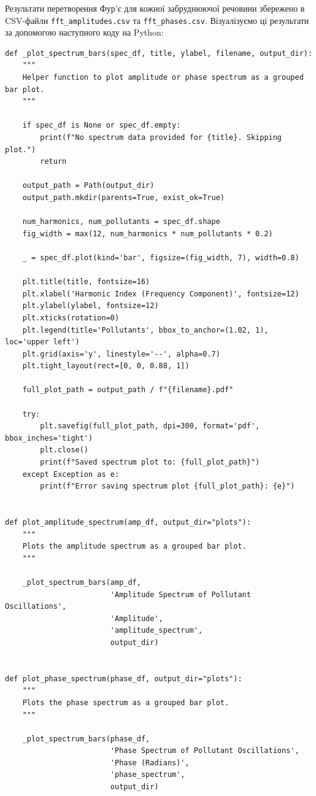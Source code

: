 \documentclass{exam_template}
\begin{document}
Результати перетворення Фур'є для кожної забруднюючої речовини 
збережено в CSV-файли \texttt{fft\_amplitudes.csv} та
\texttt{fft\_phases.csv}. Візуалізуємо ці результати 
за допомогою наступного коду на Python:
\begin{verbatim}
def _plot_spectrum_bars(spec_df, title, ylabel, filename, output_dir):
    """
    Helper function to plot amplitude or phase spectrum as a grouped bar plot.
    """
    
    if spec_df is None or spec_df.empty:
        print(f"No spectrum data provided for {title}. Skipping plot.")
        return

    output_path = Path(output_dir)
    output_path.mkdir(parents=True, exist_ok=True)

    num_harmonics, num_pollutants = spec_df.shape
    fig_width = max(12, num_harmonics * num_pollutants * 0.2)

    _ = spec_df.plot(kind='bar', figsize=(fig_width, 7), width=0.8)

    plt.title(title, fontsize=16)
    plt.xlabel('Harmonic Index (Frequency Component)', fontsize=12)
    plt.ylabel(ylabel, fontsize=12)
    plt.xticks(rotation=0)
    plt.legend(title='Pollutants', bbox_to_anchor=(1.02, 1), loc='upper left')
    plt.grid(axis='y', linestyle='--', alpha=0.7)
    plt.tight_layout(rect=[0, 0, 0.88, 1])

    full_plot_path = output_path / f"{filename}.pdf"

    try:
        plt.savefig(full_plot_path, dpi=300, format='pdf', bbox_inches='tight')
        plt.close()
        print(f"Saved spectrum plot to: {full_plot_path}")
    except Exception as e:
        print(f"Error saving spectrum plot {full_plot_path}: {e}")


def plot_amplitude_spectrum(amp_df, output_dir="plots"):
    """
    Plots the amplitude spectrum as a grouped bar plot.
    """
    
    _plot_spectrum_bars(amp_df,
                        'Amplitude Spectrum of Pollutant Oscillations',
                        'Amplitude',
                        'amplitude_spectrum',
                        output_dir)


def plot_phase_spectrum(phase_df, output_dir="plots"):
    """
    Plots the phase spectrum as a grouped bar plot.
    """
    
    _plot_spectrum_bars(phase_df,
                        'Phase Spectrum of Pollutant Oscillations',
                        'Phase (Radians)',
                        'phase_spectrum',
                        output_dir)
\end{verbatim}
\end{document}
